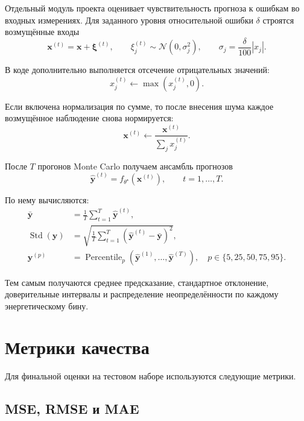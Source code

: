 \documentclass[11pt]{article}
\begin{document}
Отдельный модуль проекта оценивает чувствительность прогноза к ошибкам во входных измерениях. Для заданного уровня относительной ошибки $\delta$ строятся возмущённые входы
\begin{equation}
\mathbf{x}^{(t)} = \mathbf{x} + \boldsymbol{\xi}^{(t)},
\qquad
\xi_j^{(t)} \sim \mathcal{N}\!\left(0, \sigma_j^2\right),
\qquad
\sigma_j = \frac{\delta}{100}|x_j|.
\end{equation}

В коде дополнительно выполняется отсечение отрицательных значений:
\begin{equation}
 x_j^{(t)} \leftarrow \max(x_j^{(t)}, 0).
\end{equation}

Если включена нормализация по сумме, то после внесения шума каждое возмущённое наблюдение снова нормируется:
\begin{equation}
\mathbf{x}^{(t)} \leftarrow \frac{\mathbf{x}^{(t)}}{\sum_j x_j^{(t)}}.
\end{equation}

После $T$ прогонов Monte Carlo получаем ансамбль прогнозов
\begin{equation}
\hat{\mathbf{y}}^{(t)} = f_{\theta^{\star}}(\mathbf{x}^{(t)}),
\qquad
t=1,\dots,T.
\end{equation}

По нему вычисляются:
\begin{align}
\bar{\mathbf{y}} &= \frac{1}{T} \sum_{t=1}^{T} \hat{\mathbf{y}}^{(t)},\\
\operatorname{Std}(\mathbf{y}) &= \sqrt{\frac{1}{T} \sum_{t=1}^{T} \left(\hat{\mathbf{y}}^{(t)} - \bar{\mathbf{y}}\right)^2},\\
\mathbf{y}^{(p)} &= \operatorname{Percentile}_p\left(\hat{\mathbf{y}}^{(1)},\dots,\hat{\mathbf{y}}^{(T)}\right), \quad p \in \{5,25,50,75,95\}.
\end{align}

Тем самым получаются среднее предсказание, стандартное отклонение, доверительные интервалы и распределение неопределённости по каждому энергетическому бину.

\section{Метрики качества}

Для финальной оценки на тестовом наборе используются следующие метрики.

\subsection{MSE, RMSE и MAE}
\end{document}
